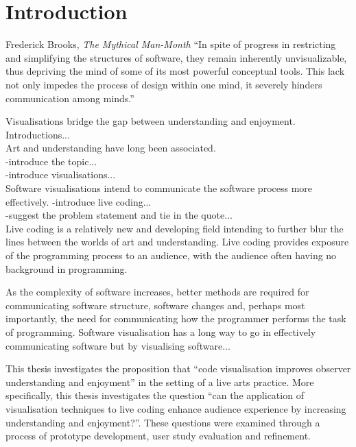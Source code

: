
\chapter{Introduction}
\label{chap:introduction}

\begin{chapquote}{Frederick Brooks, \textit{The Mythical Man-Month}}
``In spite of progress in restricting and simplifying the structures of software, they remain inherently unvisualizable, thus depriving the mind of some of its most powerful conceptual tools. This lack not only impedes the process of design within one mind, it severely hinders communication among minds.''
\end{chapquote}

Visualisations bridge the gap between understanding and enjoyment. 
Introductions...\\
Art and understanding have long been associated.\\
-introduce the topic...\\

-introduce visualisations...\\
Software visualisations intend to communicate the software process more effectively.
-introduce live coding...\\
-suggest the problem statement and tie in the quote...\\
Live coding is a relatively new and developing field intending to further blur the lines between the worlds of art and understanding. Live coding provides exposure of the programming process to an audience, with the audience often having no background in programming.

As the complexity of software increases, better methods are required for communicating software structure, software changes and, perhaps most importantly, the need for communicating how the programmer performs the task of programming. Software visualisation has a long way to go in effectively communicating software but by visualising software...


This thesis investigates the proposition that ``code visualisation improves observer understanding and enjoyment'' in the setting of a live arts practice. More specifically, this thesis investigates the question ``can the application of visualisation techniques to live coding enhance audience experience by increasing understanding and enjoyment?''. These questions were examined through a process of prototype development, user study evaluation and refinement.\\

